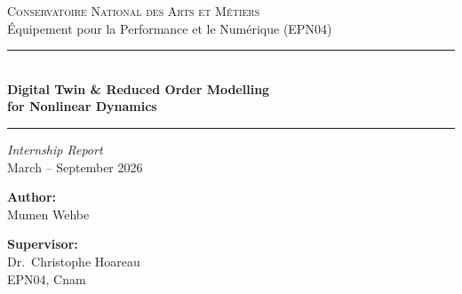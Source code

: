 \begin{titlepage}
\centering

\vspace*{1cm}



\vspace{1cm}

{\Large\scshape Conservatoire National des Arts et Métiers}\\[0.3cm]
{\large Équipement pour la Performance et le Numérique (EPN04)}

\vspace{1.5cm}

\rule{\textwidth}{1.5pt}\\[0.6cm]
{\Huge\bfseries Digital Twin \& Reduced Order Modelling\\[0.4cm] for Nonlinear Dynamics}\\[0.4cm]
\rule{\textwidth}{1.5pt}

\vspace{1.5cm}

{\Large\itshape Internship Report}\\[0.5cm]
{\large March -- September 2026}

\vspace{2cm}

\begin{minipage}[t]{0.45\textwidth}
\begin{flushleft}
\textbf{Author:}\\
Mumen Wehbe
\end{flushleft}
\end{minipage}
\hfill
\begin{minipage}[t]{0.45\textwidth}
\begin{flushright}
\textbf{Supervisor:}\\
Dr.\ Christophe Hoareau\\
EPN04, Cnam
\end{flushright}
\end{minipage}

\vfill

{\large \the\year}

\end{titlepage}
